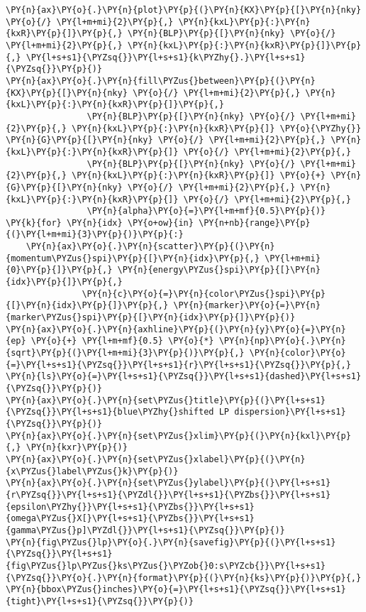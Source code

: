 \begin{Verbatim}[commandchars=\\\{\}]
\PY{n}{ax}\PY{o}{.}\PY{n}{plot}\PY{p}{(}\PY{n}{KX}\PY{p}{[}\PY{n}{nky} \PY{o}{/} \PY{l+m+mi}{2}\PY{p}{,} \PY{n}{kxL}\PY{p}{:}\PY{n}{kxR}\PY{p}{]}\PY{p}{,} \PY{n}{BLP}\PY{p}{[}\PY{n}{nky} \PY{o}{/} \PY{l+m+mi}{2}\PY{p}{,} \PY{n}{kxL}\PY{p}{:}\PY{n}{kxR}\PY{p}{]}\PY{p}{,} \PY{l+s+s1}{\PYZsq{}}\PY{l+s+s1}{k\PYZhy{}.}\PY{l+s+s1}{\PYZsq{}}\PY{p}{)}
\PY{n}{ax}\PY{o}{.}\PY{n}{fill\PYZus{}between}\PY{p}{(}\PY{n}{KX}\PY{p}{[}\PY{n}{nky} \PY{o}{/} \PY{l+m+mi}{2}\PY{p}{,} \PY{n}{kxL}\PY{p}{:}\PY{n}{kxR}\PY{p}{]}\PY{p}{,}
                \PY{n}{BLP}\PY{p}{[}\PY{n}{nky} \PY{o}{/} \PY{l+m+mi}{2}\PY{p}{,} \PY{n}{kxL}\PY{p}{:}\PY{n}{kxR}\PY{p}{]} \PY{o}{\PYZhy{}} \PY{n}{G}\PY{p}{[}\PY{n}{nky} \PY{o}{/} \PY{l+m+mi}{2}\PY{p}{,} \PY{n}{kxL}\PY{p}{:}\PY{n}{kxR}\PY{p}{]} \PY{o}{/} \PY{l+m+mi}{2}\PY{p}{,}
                \PY{n}{BLP}\PY{p}{[}\PY{n}{nky} \PY{o}{/} \PY{l+m+mi}{2}\PY{p}{,} \PY{n}{kxL}\PY{p}{:}\PY{n}{kxR}\PY{p}{]} \PY{o}{+} \PY{n}{G}\PY{p}{[}\PY{n}{nky} \PY{o}{/} \PY{l+m+mi}{2}\PY{p}{,} \PY{n}{kxL}\PY{p}{:}\PY{n}{kxR}\PY{p}{]} \PY{o}{/} \PY{l+m+mi}{2}\PY{p}{,}
                \PY{n}{alpha}\PY{o}{=}\PY{l+m+mf}{0.5}\PY{p}{)}
\PY{k}{for} \PY{n}{idx} \PY{o+ow}{in} \PY{n+nb}{range}\PY{p}{(}\PY{l+m+mi}{3}\PY{p}{)}\PY{p}{:}
    \PY{n}{ax}\PY{o}{.}\PY{n}{scatter}\PY{p}{(}\PY{n}{momentum\PYZus{}spi}\PY{p}{[}\PY{n}{idx}\PY{p}{,} \PY{l+m+mi}{0}\PY{p}{]}\PY{p}{,} \PY{n}{energy\PYZus{}spi}\PY{p}{[}\PY{n}{idx}\PY{p}{]}\PY{p}{,}
               \PY{n}{c}\PY{o}{=}\PY{n}{color\PYZus{}spi}\PY{p}{[}\PY{n}{idx}\PY{p}{]}\PY{p}{,} \PY{n}{marker}\PY{o}{=}\PY{n}{marker\PYZus{}spi}\PY{p}{[}\PY{n}{idx}\PY{p}{]}\PY{p}{)}
\PY{n}{ax}\PY{o}{.}\PY{n}{axhline}\PY{p}{(}\PY{n}{y}\PY{o}{=}\PY{n}{ep} \PY{o}{+} \PY{l+m+mf}{0.5} \PY{o}{*} \PY{n}{np}\PY{o}{.}\PY{n}{sqrt}\PY{p}{(}\PY{l+m+mi}{3}\PY{p}{)}\PY{p}{,} \PY{n}{color}\PY{o}{=}\PY{l+s+s1}{\PYZsq{}}\PY{l+s+s1}{r}\PY{l+s+s1}{\PYZsq{}}\PY{p}{,} \PY{n}{ls}\PY{o}{=}\PY{l+s+s1}{\PYZsq{}}\PY{l+s+s1}{dashed}\PY{l+s+s1}{\PYZsq{}}\PY{p}{)}
\PY{n}{ax}\PY{o}{.}\PY{n}{set\PYZus{}title}\PY{p}{(}\PY{l+s+s1}{\PYZsq{}}\PY{l+s+s1}{blue\PYZhy{}shifted LP dispersion}\PY{l+s+s1}{\PYZsq{}}\PY{p}{)}
\PY{n}{ax}\PY{o}{.}\PY{n}{set\PYZus{}xlim}\PY{p}{(}\PY{n}{kxl}\PY{p}{,} \PY{n}{kxr}\PY{p}{)}
\PY{n}{ax}\PY{o}{.}\PY{n}{set\PYZus{}xlabel}\PY{p}{(}\PY{n}{x\PYZus{}label\PYZus{}k}\PY{p}{)}
\PY{n}{ax}\PY{o}{.}\PY{n}{set\PYZus{}ylabel}\PY{p}{(}\PY{l+s+s1}{r\PYZsq{}}\PY{l+s+s1}{\PYZdl{}}\PY{l+s+s1}{\PYZbs{}}\PY{l+s+s1}{epsilon\PYZhy{}}\PY{l+s+s1}{\PYZbs{}}\PY{l+s+s1}{omega\PYZus{}X[}\PY{l+s+s1}{\PYZbs{}}\PY{l+s+s1}{gamma\PYZus{}p]\PYZdl{}}\PY{l+s+s1}{\PYZsq{}}\PY{p}{)}
\PY{n}{fig\PYZus{}lp}\PY{o}{.}\PY{n}{savefig}\PY{p}{(}\PY{l+s+s1}{\PYZsq{}}\PY{l+s+s1}{fig\PYZus{}lp\PYZus{}ks\PYZus{}\PYZob{}0:s\PYZcb{}}\PY{l+s+s1}{\PYZsq{}}\PY{o}{.}\PY{n}{format}\PY{p}{(}\PY{n}{ks}\PY{p}{)}\PY{p}{,} \PY{n}{bbox\PYZus{}inches}\PY{o}{=}\PY{l+s+s1}{\PYZsq{}}\PY{l+s+s1}{tight}\PY{l+s+s1}{\PYZsq{}}\PY{p}{)}

\end{Verbatim}
